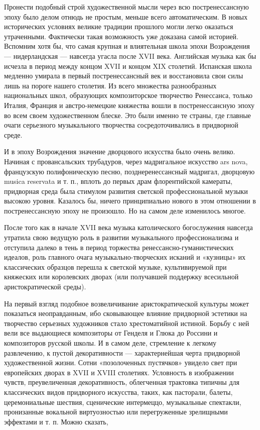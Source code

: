 Пронести    подобный   строй    художественной    мысли   через    всю
постренессансную  эпоху было  делом  отнюдь не  простым, меньше  всего
автоматическим.  В   новых  исторических  условиях   великие  традиции
прошлого   могли  легко   оказаться   утраченными.  Фактически   такая
возможность уже доказана  самой историей. Вспомним хотя  бы, что самая
крупная  и  влиятельная  школа  эпохи Возрождения  —  нидерландская  —
навсегда угасла  после XVII века.  Английская музыка как бы  исчезла в
период  между  концом XVII  и  концом  XIX столетий.  Испанская  школа
медленно  умирала   в  первый  постренессансный  век   и  восстановила
свои  силы  лишь  на  пороге   нашего  столетия.  Из  всего  множества
разнообразных национальных школ,  образующих композиторское творчество
Ренессанса, только Италия, Франция и австро-немецкие княжества вошли в
постренессансную эпоху  во всем своем художественном  блеске. Это были
именно те страны, где главные очаги серьезного музыкального творчества
сосредоточивались в придворной среде.

И в эпоху Возрождения значение дворцового искусства было очень велико.
Начиная  с  провансальских  трубадуров, через  мадригальное  искусство
ars   nova,  французскую   полифоническую  песню,   позднеренессансный
мадригал,  дворцовую  musica  reservata  и т.  п.,  вплоть  до  первых
драм флорентийской  камераты, придворная среда была  стимулом развития
светской профессиональной  музыки высокою уровня. Казалось  бы, ничего
принципиально  нового в  этом  отношении в  постренессансную эпоху  не
произошло. Но на самом деле изменилось многое.

После   того   как   в   начале   XVII   века   музыка   католического
богослужения   навсегда  утратила   свою  ведущую   роль  в   развитии
музыкального   профессионализма   и   отступила  далеко   в   тень   в
период  торжества ренессансно-гуманистических  идеалов, роль  главного
очага  музыкально-творческих  исканий   и  «кузницы»  их  классических
образцов  перешла  к  светской музыке,  культивируемой  при  княжеских
или   королевских   дворах   (или  получавшей   поддержку   всесильной
аристократической среды).

На  первый взгляд  подобное возвеличивание  аристократической культуры
может  показаться неоправданным,  ибо  сковывающее влияние  придворной
эстетики  на  творчество  серьезных  художников  стало  хрестоматийной
истиной.  Борьбу с  ней  вели все  выдающиеся  композиторы от  Генделя
и  Глюка  до   Россини  и  композиторов  русской  школы.   И  в  самом
деле,  стремление  к  легкому  развлечению,  к  пустой  декоративности
—   характернейшая  черта   придворной  художественной   жизни.  Сотни
«позолоченных пустячков» увидело свет при  европейских дворах в XVII и
XVIII  столетиях.  Условность  в  изображении  чувств,  преувеличенная
декоративность, облегченная  трактовка типичны для  классических видов
придворного  искусства, таких,  как пасторали,  балеты, церемониальные
шествия,  сценические интермеццо,  музыкальные спектакли,  пронизанные
вокальной виртуозностью или перегруженные зрелищными эффектами и т. п.
Можно сказать,
